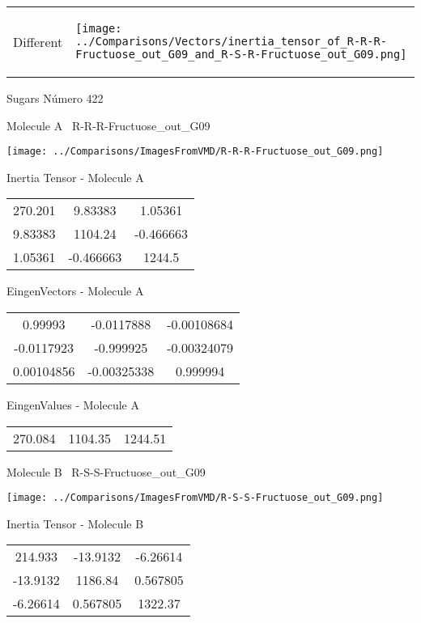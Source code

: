\vtab[-5mm]
\begin{tabular}{*{2}{m{}}}
\begin{center}
\textcolor{NavyBlue}{\Large Different}
\end{center}
&
\begin{center}
\texttt{[image: ../Comparisons/Vectors/inertia\_tensor\_of\_R-R-R-Fructuose\_out\_G09\_and\_R-S-R-Fructuose\_out\_G09.png]}
\end{center}
\end{tabular}

 \newpage

\vtab[-3cm]
\begin{center}
{\large Sugars \tab Número 422}
\end{center}
\begin{multicols}{2}
\begin{center}

Molecule A \
R-R-R-Fructuose\_out\_G09

\texttt{[image: ../Comparisons/ImagesFromVMD/R-R-R-Fructuose\_out\_G09.png]}

Inertia Tensor - Molecule A \\
\begin{tabular}{|c c c|}
270.201	 & 	9.83383	 & 	1.05361	 \\
9.83383	 & 	1104.24	 & 	-0.466663	 \\
1.05361	 & 	-0.466663	 & 	1244.5
\end{tabular}

\vtab
 EingenVectors - Molecule A     \\
\begin{tabular}{|c c c|}
0.99993	 & 	-0.0117888	 & 	-0.00108684	 \\
-0.0117923	 & 	-0.999925	 & 	-0.00324079	 \\
0.00104856	 & 	-0.00325338	 & 	0.999994
\end{tabular}

\vtab
 EingenValues - Molecule A     \\
\begin{tabular}{|c c c|}
270.084	 & 	1104.35	 & 	1244.51	 \\
\end{tabular}
\columnbreak

Molecule B \
R-S-S-Fructuose\_out\_G09

\texttt{[image: ../Comparisons/ImagesFromVMD/R-S-S-Fructuose\_out\_G09.png]}

Inertia Tensor - Molecule B \\
\begin{tabular}{|c c c|}
214.933	 & 	-13.9132	 & 	-6.26614	 \\
-13.9132	 & 	1186.84	 & 	0.567805	 \\
-6.26614	 & 	0.567805	 & 	1322.37
\end{tabular}


\end{center}
\end{multicols}
